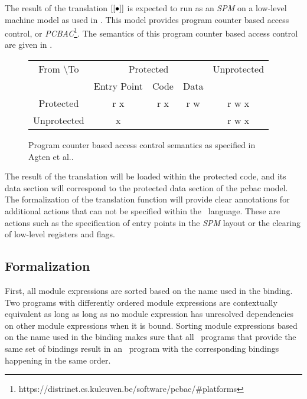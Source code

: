 The result of the translation $[[\bullet]]$ is expected to run as an \emph{SPM} on a low-level machine model as used in \cite{Agten:2012:SCM:2354412.2355247,Patrignani}.
This model provides program counter based access control, or \emph{PCBAC}\footnote{https://distrinet.cs.kuleuven.be/software/pcbac/\#platforms}.
The semantics of this program counter based access control are given in .

\begin{figure}[htb]
    \centering
	\begin{tabular}{|c|c|c|c|c|}
		\hline
		From \textbackslash To & \multicolumn{3}{c|}{Protected} & Unprotected \\
		& Entry Point & Code & Data & \\ \hline
		Protected & r x & r x & r w & r w x \\ \hline
		Unprotected & x & & & r w x \\ \hline
	\end{tabular}
    \caption[PCBAC Semantics]{Program counter based access control semantics as specified in Agten et al.\cite{Agten:2012:SCM:2354412.2355247}. \label{fig:PCBAC}}
\end{figure}

The result of the translation will be loaded within the protected code, and its data section will correspond to the protected data section of the pcbac model.
The formalization of the translation function \cmath{\compile{\bullet}} will provide clear annotations for additional actions that can not be specified within the \LLVMIR\ language.
These are actions such as the specification of entry points in the \emph{SPM} layout or the clearing of low-level registers and flags.

\subsection{Formalization}
\label{sec:formalization}
First, all module expressions are sorted based on the name used in the binding.
Two programs with differently ordered module expressions  are contextually equivalent as long as long as no module expression  has unresolved dependencies on other module expressions when it is bound.
Sorting module expressions based on the name used in the binding makes sure that all \MiniML\ programs that provide the same set of bindings result in an \LLVMIR\ program with the corresponding bindings happening in the same order.



